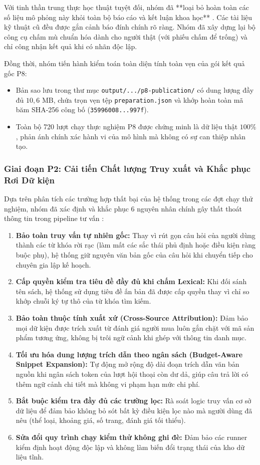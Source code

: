 Với tinh thần trung thực học thuật tuyệt đối, nhóm đã **loại bỏ hoàn toàn các số liệu mô phỏng này khỏi toàn bộ báo cáo và kết luận khoa học** . Các tài liệu kỹ thuật cũ đều được gắn cảnh báo đính chính rõ ràng. Nhóm đã xây dựng lại bộ công cụ chấm mù chuẩn hóa dành cho người thật (với phiếu chấm để trống) và chỉ công nhận kết quả khi có nhãn độc lập.

Đồng thời, nhóm tiến hành kiểm toán toàn diện tính toàn vẹn của gói kết quả gốc P8:
\begin{itemize}
    \item Bản sao lưu trong thư mục \texttt{output/.../p8-publication/} có dung lượng đầy đủ $10{,}6$ MB, chứa trọn vẹn tệp \texttt{preparation.json} và khớp hoàn toàn mã băm SHA-256 công bố (\texttt{35996008...997f}).
    \item Toàn bộ 720 lượt chạy thực nghiệm P8 được chứng minh là dữ liệu thật $100\%$, phản ánh chính xác hành vi của mô hình mà không có sự can thiệp nhân tạo.
\end{itemize}

\subsubsection{Giai đoạn P2: Cải tiến Chất lượng Truy xuất và Khắc phục Rơi Dữ kiện}
Dựa trên phân tích các trường hợp thất bại của hệ thống trong các đợt chạy thử nghiệm, nhóm đã xác định và khắc phục 6 nguyên nhân chính gây thất thoát thông tin trong pipeline tư vấn :
\begin{enumerate}
    \item \textbf{Bảo toàn truy vấn tự nhiên gốc:} Thay vì rút gọn câu hỏi của người dùng thành các từ khóa rời rạc (làm mất các sắc thái phủ định hoặc điều kiện ràng buộc phụ), hệ thống giữ nguyên văn bản gốc của câu hỏi khi chuyển tiếp cho chuyên gia lập kế hoạch.
    \item \textbf{Cấp quyền kiểm tra tiêu đề đầy đủ khi chấm Lexical:} Khi đối sánh tên sách, hệ thống sử dụng tiêu đề ấn bản đã được cấp quyền thay vì chỉ so khớp chuỗi ký tự thô của từ khóa tìm kiếm.
    \item \textbf{Bảo toàn thuộc tính xuất xứ (Cross-Source Attribution):} Đảm bảo mọi dữ kiện được trích xuất từ đánh giá người mua luôn gắn chặt với mã sản phẩm tương ứng, không bị trôi ngữ cảnh khi ghép với thông tin danh mục.
    \item \textbf{Tối ưu hóa dung lượng trích dẫn theo ngân sách (Budget-Aware Snippet Expansion):} Tự động mở rộng độ dài đoạn trích dẫn văn bản nguồn khi ngân sách token của lượt hội thoại còn dư dả, giúp câu trả lời có thêm ngữ cảnh chi tiết mà không vi phạm hạn mức chi phí.
    \item \textbf{Bắt buộc kiểm tra đầy đủ các trường lọc:} Rà soát logic truy vấn cơ sở dữ liệu để đảm bảo không bỏ sót bất kỳ điều kiện lọc nào mà người dùng đã nêu (thể loại, khoảng giá, số trang, đánh giá tối thiểu).
    \item \textbf{Sửa đổi quy trình chạy kiểm thử không ghi đè:} Đảm bảo các runner kiểm định hoạt động độc lập và không làm biến đổi trạng thái của kho dữ liệu tĩnh.
\end{enumerate}

